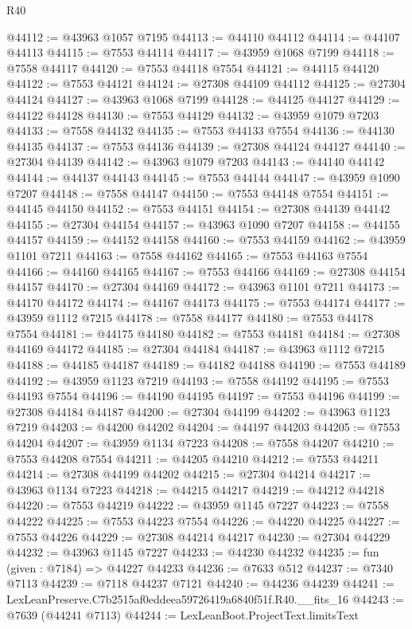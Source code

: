 \begin{lexlean}{R40}
\begin{coremodule}
@44112 := @43963 @1057 @7195
@44113 := @44110 @44112
@44114 := @44107 @44113
@44115 := @7553 @44114
@44117 := @43959 @1068 @7199
@44118 := @7558 @44117
@44120 := @7553 @44118 @7554
@44121 := @44115 @44120
@44122 := @7553 @44121
@44124 := @27308 @44109 @44112
@44125 := @27304 @44124
@44127 := @43963 @1068 @7199
@44128 := @44125 @44127
@44129 := @44122 @44128
@44130 := @7553 @44129
@44132 := @43959 @1079 @7203
@44133 := @7558 @44132
@44135 := @7553 @44133 @7554
@44136 := @44130 @44135
@44137 := @7553 @44136
@44139 := @27308 @44124 @44127
@44140 := @27304 @44139
@44142 := @43963 @1079 @7203
@44143 := @44140 @44142
@44144 := @44137 @44143
@44145 := @7553 @44144
@44147 := @43959 @1090 @7207
@44148 := @7558 @44147
@44150 := @7553 @44148 @7554
@44151 := @44145 @44150
@44152 := @7553 @44151
@44154 := @27308 @44139 @44142
@44155 := @27304 @44154
@44157 := @43963 @1090 @7207
@44158 := @44155 @44157
@44159 := @44152 @44158
@44160 := @7553 @44159
@44162 := @43959 @1101 @7211
@44163 := @7558 @44162
@44165 := @7553 @44163 @7554
@44166 := @44160 @44165
@44167 := @7553 @44166
@44169 := @27308 @44154 @44157
@44170 := @27304 @44169
@44172 := @43963 @1101 @7211
@44173 := @44170 @44172
@44174 := @44167 @44173
@44175 := @7553 @44174
@44177 := @43959 @1112 @7215
@44178 := @7558 @44177
@44180 := @7553 @44178 @7554
@44181 := @44175 @44180
@44182 := @7553 @44181
@44184 := @27308 @44169 @44172
@44185 := @27304 @44184
@44187 := @43963 @1112 @7215
@44188 := @44185 @44187
@44189 := @44182 @44188
@44190 := @7553 @44189
@44192 := @43959 @1123 @7219
@44193 := @7558 @44192
@44195 := @7553 @44193 @7554
@44196 := @44190 @44195
@44197 := @7553 @44196
@44199 := @27308 @44184 @44187
@44200 := @27304 @44199
@44202 := @43963 @1123 @7219
@44203 := @44200 @44202
@44204 := @44197 @44203
@44205 := @7553 @44204
@44207 := @43959 @1134 @7223
@44208 := @7558 @44207
@44210 := @7553 @44208 @7554
@44211 := @44205 @44210
@44212 := @7553 @44211
@44214 := @27308 @44199 @44202
@44215 := @27304 @44214
@44217 := @43963 @1134 @7223
@44218 := @44215 @44217
@44219 := @44212 @44218
@44220 := @7553 @44219
@44222 := @43959 @1145 @7227
@44223 := @7558 @44222
@44225 := @7553 @44223 @7554
@44226 := @44220 @44225
@44227 := @7553 @44226
@44229 := @27308 @44214 @44217
@44230 := @27304 @44229
@44232 := @43963 @1145 @7227
@44233 := @44230 @44232
@44235 := fun (given : @7184) => @44227 @44233
@44236 := @7633 @512
@44237 := @7340 @7113
@44239 := @7118 @44237 @7121
@44240 := @44236 @44239
@44241 := LexLeanPreserve.C7b2515af0eddeea59726419a6840f51f.R40.__fits_16
@44243 := @7639 (@44241 @7113)
@44244 := LexLeanBoot.ProjectText.limitsText

\end{coremodule}
\end{lexlean}

